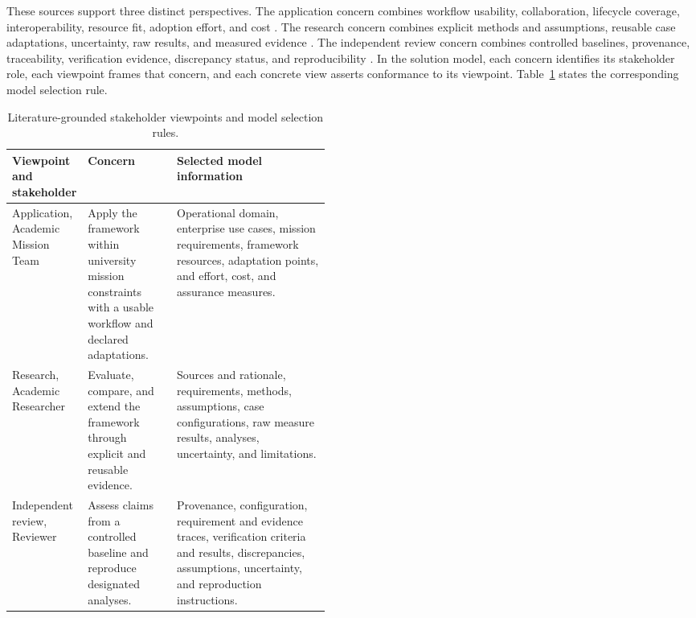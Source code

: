 \documentclass[11pt,a4paper]{article}
\begin{document}
These sources support three distinct perspectives. The application concern combines workflow usability, collaboration, lifecycle coverage, interoperability, resource fit, adoption effort, and cost \citep{buruso2026modelbased,vizitiu2025optimizing,rojasramirez2022comparative}. The research concern combines explicit methods and assumptions, reusable case adaptations, uncertainty, raw results, and measured evidence \citep{buruso2026modelbased,rostamnia2026digitaltwin,rojasramirez2022comparative,akundi2022textmining}. The independent review concern combines controlled baselines, provenance, traceability, verification evidence, discrepancy status, and reproducibility \citep{buruso2026modelbased,rostamnia2026digitaltwin,rojasramirez2022comparative}. In the solution model, each concern identifies its stakeholder role, each viewpoint frames that concern, and each concrete view asserts conformance to its viewpoint. Table~\ref{tab:framework-stakeholder-viewpoints} states the corresponding model selection rule.

\begin{table}[H]
    \centering
    \small
    \caption{Literature-grounded stakeholder viewpoints and model selection rules.}
    \label{tab:framework-stakeholder-viewpoints}
    \begin{tabularx}{\linewidth}{>{\raggedright\arraybackslash}p{0.18\linewidth} >{\raggedright\arraybackslash}p{0.28\linewidth} X}
        \toprule
        \textbf{Viewpoint and stakeholder} & \textbf{Concern} & \textbf{Selected model information} \\
        \midrule
        Application, Academic Mission Team & Apply the framework within university mission constraints with a usable workflow and declared adaptations. & Operational domain, enterprise use cases, mission requirements, framework resources, adaptation points, and effort, cost, and assurance measures. \\
        Research, Academic Researcher & Evaluate, compare, and extend the framework through explicit and reusable evidence. & Sources and rationale, requirements, methods, assumptions, case configurations, raw measure results, analyses, uncertainty, and limitations. \\
        Independent review, Reviewer & Assess claims from a controlled baseline and reproduce designated analyses. & Provenance, configuration, requirement and evidence traces, verification criteria and results, discrepancies, assumptions, uncertainty, and reproduction instructions. \\
        \bottomrule
    \end{tabularx}
\end{table}
\end{document}
